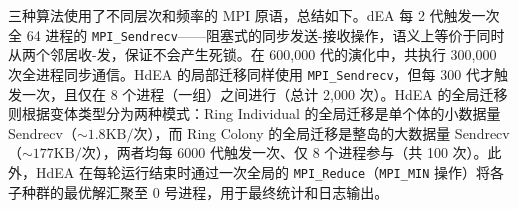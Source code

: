 三种算法使用了不同层次和频率的 MPI 原语，总结如下。dEA 每 2 代触发一次全 64 进程的 \texttt{MPI\_Sendrecv}——阻塞式的同步发送-接收操作，语义上等价于同时从两个邻居收-发，保证不会产生死锁。在 600,000 代的演化中，共执行 300,000 次全进程同步通信。HdEA 的局部迁移同样使用 \texttt{MPI\_Sendrecv}，但每 300 代才触发一次，且仅在 8 个进程（一组）之间进行（总计 2,000 次）。HdEA 的全局迁移则根据变体类型分为两种模式：Ring Individual 的全局迁移是单个体的小数据量 Sendrecv（$\sim 1.8\text{KB}/\text{次}$），而 Ring Colony 的全局迁移是整岛的大数据量 Sendrecv（$\sim 177\text{KB}/\text{次}$），两者均每 6000 代触发一次、仅 8 个进程参与（共 100 次）。此外，HdEA 在每轮运行结束时通过一次全局的 \texttt{MPI\_Reduce}（\texttt{MPI\_MIN} 操作）将各子种群的最优解汇聚至 0 号进程，用于最终统计和日志输出。
